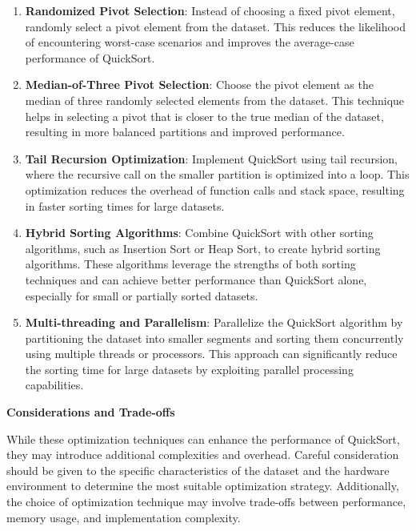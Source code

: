 \documentclass[12pt]{book} %
\begin{document}
\begin{enumerate}
    \item \textbf{Randomized Pivot Selection}: Instead of choosing a fixed pivot element, randomly select a pivot element from the dataset. This reduces the likelihood of encountering worst-case scenarios and improves the average-case performance of QuickSort.
    
    \item \textbf{Median-of-Three Pivot Selection}: Choose the pivot element as the median of three randomly selected elements from the dataset. This technique helps in selecting a pivot that is closer to the true median of the dataset, resulting in more balanced partitions and improved performance.
    
    \item \textbf{Tail Recursion Optimization}: Implement QuickSort using tail recursion, where the recursive call on the smaller partition is optimized into a loop. This optimization reduces the overhead of function calls and stack space, resulting in faster sorting times for large datasets.
    
    \item \textbf{Hybrid Sorting Algorithms}: Combine QuickSort with other sorting algorithms, such as Insertion Sort or Heap Sort, to create hybrid sorting algorithms. These algorithms leverage the strengths of both sorting techniques and can achieve better performance than QuickSort alone, especially for small or partially sorted datasets.
    
    \item \textbf{Multi-threading and Parallelism}: Parallelize the QuickSort algorithm by partitioning the dataset into smaller segments and sorting them concurrently using multiple threads or processors. This approach can significantly reduce the sorting time for large datasets by exploiting parallel processing capabilities.
\end{enumerate}

\textbf{Considerations and Trade-offs}

While these optimization techniques can enhance the performance of QuickSort, they may introduce additional complexities and overhead. Careful consideration should be given to the specific characteristics of the dataset and the hardware environment to determine the most suitable optimization strategy. Additionally, the choice of optimization technique may involve trade-offs between performance, memory usage, and implementation complexity.
\end{document}
